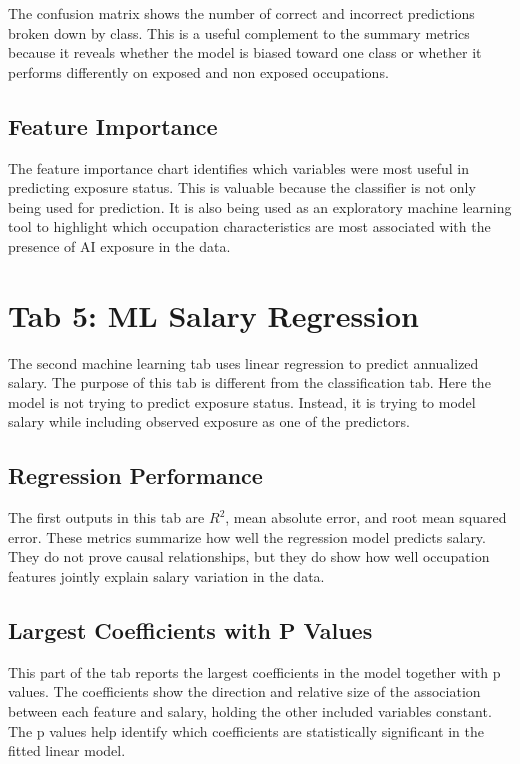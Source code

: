 \documentclass[11pt]{article}
\begin{document}
The confusion matrix shows the number of correct and incorrect predictions broken down by class. This is a useful complement to the summary metrics because it reveals whether the model is biased toward one class or whether it performs differently on exposed and non exposed occupations.

\subsection*{Feature Importance}

The feature importance chart identifies which variables were most useful in predicting exposure status. This is valuable because the classifier is not only being used for prediction. It is also being used as an exploratory machine learning tool to highlight which occupation characteristics are most associated with the presence of AI exposure in the data.

\section*{Tab 5: ML Salary Regression}

The second machine learning tab uses linear regression to predict annualized salary. The purpose of this tab is different from the classification tab. Here the model is not trying to predict exposure status. Instead, it is trying to model salary while including observed exposure as one of the predictors.

\subsection*{Regression Performance}

The first outputs in this tab are \(R^2\), mean absolute error, and root mean squared error. These metrics summarize how well the regression model predicts salary. They do not prove causal relationships, but they do show how well occupation features jointly explain salary variation in the data.

\subsection*{Largest Coefficients with P Values}

This part of the tab reports the largest coefficients in the model together with p values. The coefficients show the direction and relative size of the association between each feature and salary, holding the other included variables constant. The p values help identify which coefficients are statistically significant in the fitted linear model.
\end{document}
